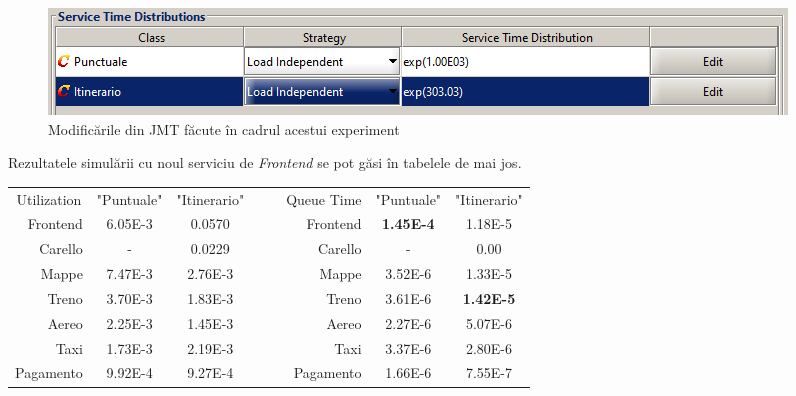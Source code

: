 \documentclass[12pt]{article}
\begin{document}
            \begin{figure}[!h]
                \centering
                \includegraphics[width=\textwidth]{images/exp1_setup.png}
                \caption{Modificările din JMT făcute în cadrul acestui experiment}
            \end{figure}

            Rezultatele simulării cu noul serviciu de \textit{Frontend} se pot găsi în tabelele de mai jos.
            \pagebreak

            \begin{table}[!h]
                \centering
                \begin{tabular}{r|cclrr|cc}
                    \multicolumn{1}{c|}{Utilization} & "Puntuale" & "Itinerario" &  & \multicolumn{1}{c}{} & \multicolumn{1}{c|}{Queue Time} & "Puntuale"       & "Itinerario"     \\ \cline{1-3} \cline{6-8} 
                    Frontend                         & 6.05E-3    & 0.0570       &  &                      & Frontend                        & \textbf{1.45E-4} & 1.18E-5          \\
                    Carello                          & -          & 0.0229       &  &                      & Carello                         & -                & 0.00             \\
                    Mappe                            & 7.47E-3    & 2.76E-3      &  &                      & Mappe                           & 3.52E-6          & 1.33E-5          \\
                    Treno                            & 3.70E-3    & 1.83E-3      &  &                      & Treno                           & 3.61E-6          & \textbf{1.42E-5} \\
                    Aereo                            & 2.25E-3    & 1.45E-3      &  &                      & Aereo                           & 2.27E-6          & 5.07E-6          \\
                    Taxi                             & 1.73E-3    & 2.19E-3      &  &                      & Taxi                            & 3.37E-6          & 2.80E-6          \\
                    Pagamento                        & 9.92E-4    & 9.27E-4      &  &                      & Pagamento                       & 1.66E-6          & 7.55E-7         
                \end{tabular}
            \end{table}
\end{document}
